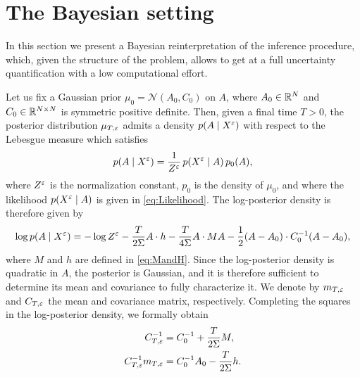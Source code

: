 \documentclass[10pt]{article}
\begin{document}
\section{The Bayesian setting}\label{sec:Bayesian}

In this section we present a Bayesian reinterpretation of the inference procedure, which, given the structure of the problem, allows to get at a full uncertainty quantification with a low computational effort. 

Let us fix a Gaussian prior $\mu_0 = \mathcal N(A_0, C_0)$ on $A$, where $A_0 \in \mathbb{R}^N$ and $C_0 \in \mathbb{R}^{N\times N}$ is symmetric positive definite. Then, given a final time $T > 0$, the posterior distribution $\mu_{T,\varepsilon}$ admits a density $p(A \mid X^\varepsilon)$ with respect to the Lebesgue measure which satisfies
\begin{equation}
p(A \mid X^\varepsilon) = \frac1{Z^\varepsilon} \, p(X^\varepsilon \mid A) \, p_0(A),
\end{equation}
where $Z^\varepsilon$ is the normalization constant, $p_0$ is the density of $\mu_0$, and where the likelihood $p(X^\varepsilon \mid A)$ is given in \eqref{eq:Likelihood}. The log-posterior density is therefore given by
\begin{equation}\label{eq:Posterior}
\log p(A \mid X^\varepsilon) = -\log Z^\varepsilon - \frac{T}{2\Sigma} A \cdot h - \frac{T}{4\Sigma} A \cdot M A - \frac12 (A - A_0) \cdot C_0^{-1}(A-A_0),
\end{equation}
where $M$ and $h$ are defined in \eqref{eq:MandH}.
Since the log-posterior density is quadratic in $A$, the posterior is Gaussian, and it is therefore sufficient to determine its mean and covariance to fully characterize it. We denote by $m_{T,\varepsilon}$ and $C_{T,\varepsilon}$ the mean and covariance matrix, respectively. Completing the squares in the log-posterior density, we formally obtain
\begin{equation}
\begin{aligned}
C_{T,\varepsilon}^{-1} &= C_0^{-1} + \frac{T}{2\Sigma} M, \\
C_{T,\varepsilon}^{-1}m_{T,\varepsilon} &= C_0^{-1}A_0 - \frac{T}{2\Sigma} h. 
\end{aligned}
\end{equation}
\end{document}

